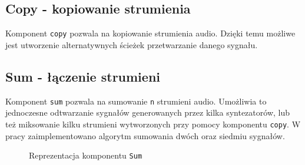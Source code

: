 \subsection{Copy - kopiowanie strumienia}
Komponent \texttt{copy} pozwala na kopiowanie strumienia audio. Dzięki temu możliwe jest utworzenie alternatywnych ścieżek przetwarzanie danego sygnału.

\subsection{Sum - łączenie strumieni}
Komponent \texttt{sum} pozwala na sumowanie \texttt{n} strumieni audio. Umożliwia to jednoczesne odtwarzanie sygnałów generowanych przez kilka syntezatorów, lub też miksowanie kilku strumieni wytworzonych przy pomocy komponentu \texttt{copy}. W pracy zaimplementowano algorytm sumowania dwóch oraz siedmiu sygnałów.

\begin{figure}[H]
    \centering
    
    \caption{Reprezentacja komponentu \texttt{Sum}}
    \label{fig:Reprezentacja komponentu Sum}
\end{figure}